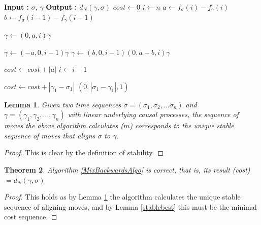 \documentclass{article}
\newtheorem{theorem}{Theorem}
\newtheorem{lemma}[theorem]{Lemma}
\theoremstyle{Definition}
\theoremstyle{definition}
\begin{document}
	\begin{algorithm}
		\caption{$d_N$ Backwards Computation Algorithm}
		\label{MixBackwardsAlgo}
		\begin{algorithmic}
			\State \textbf{Input : }  $\sigma$, $\gamma$
			\State \textbf{Output : }  $d_N(\gamma, \sigma)$
			\State $cost \gets 0$
			\State $i \gets n$
			\State $a \gets f_\sigma(i) - f_\gamma(i)$
			\State $b \gets f_\sigma(i-1) - f_\gamma(i-1)$
			
		\State $\gamma \gets (0, a, i) \gamma$
		
	
	\State $\gamma \gets (-a, 0, i-1)\gamma$
	\Else
\State $\gamma \gets (b, 0, i-1)(0, a-b, i) \gamma$
\EndIf

\State  $cost \gets cost + |a|$ 
\State $i \gets i-1$
\EndWhile

\State $cost \gets cost + |\gamma_1 - \sigma_1|$  \Comment $(0, |\sigma_1- \gamma_1|, 1)$

\end{algorithmic}
\end{algorithm}

\begin{lemma}\label {mixwordalgostable} Given two time sequences $\sigma = (\sigma_1, \sigma_2, \dots \sigma_n)$ and $\gamma = (\gamma_1, \gamma_2, \dots , \gamma_n)$ with linear underlying causal processes, the sequence of moves the above algorithm calculates ($m$) corresponds to the unique stable sequence of moves that aligns $\sigma$ to $\gamma$. 
\end{lemma}


\begin{proof}
	This is clear by the definition of stability. 
\end{proof}

\begin{theorem}\label{MixAlgoCorr} Algorithm \ref{MixBackwardsAlgo} is correct, that is, its result \textsf(cost) $ = d_N(\gamma, \sigma)$
\end{theorem}

\begin{proof}
	This holds as by Lemma \ref{mixwordalgostable} the algorithm calculates the unique stable sequence of aligning moves, and by Lemma \ref{stablebest} this must be the minimal cost sequence. 
\end{proof}
\end{document}
